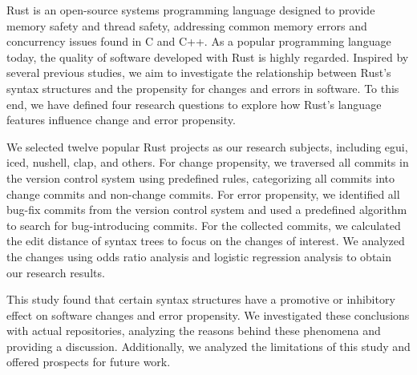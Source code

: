 \documentclass[
  ]{njuthesis}
\begin{document}
\begin{abstract*}
    Rust is an open-source systems programming language designed to provide memory safety and thread safety, addressing common memory errors and concurrency issues found in C and C++. As a popular programming language today, the quality of software developed with Rust is highly regarded. Inspired by several previous studies, we aim to investigate the relationship between Rust's syntax structures and the propensity for changes and errors in software. To this end, we have defined four research questions to explore how Rust's language features influence change and error propensity.
    
    We selected twelve popular Rust projects as our research subjects, including egui, iced, nushell, clap, and others. For change propensity, we traversed all commits in the version control system using predefined rules, categorizing all commits into change commits and non-change commits. For error propensity, we identified all bug-fix commits from the version control system and used a predefined algorithm to search for bug-introducing commits. For the collected commits, we calculated the edit distance of syntax trees to focus on the changes of interest. We analyzed the changes using odds ratio analysis and logistic regression analysis to obtain our research results.
    
    This study found that certain syntax structures have a promotive or inhibitory effect on software changes and error propensity. We investigated these conclusions with actual repositories, analyzing the reasons behind these phenomena and providing a discussion. Additionally, we analyzed the limitations of this study and offered prospects for future work.
\end{abstract*}

\tableofcontents

\mainmatter

\end{document}
